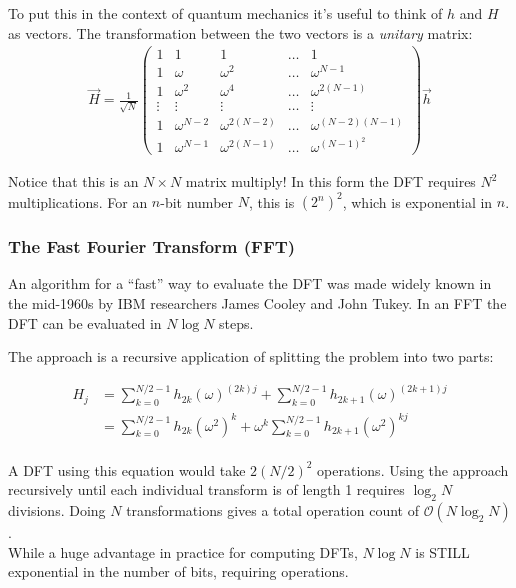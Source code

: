 \documentclass{book}
\theoremstyle{definition}
\newcommand{\nn}{\nonumber}
\newcommand{\f}[2]{\frac{#1}{#2}}
\begin{document}
To put this in the context of quantum mechanics it's useful to think of $h$
and $H$ as vectors. The transformation between the two vectors is a \textit{unitary} matrix:
\begin{align}
\vec{H} = \f{1}{\sqrt{N}}\begin{pmatrix}
1 & 1 & 1 & \dots & 1\\
1 & \omega & \omega^2 &\dots & \omega^{N-1}\\
1 & \omega^2 & \omega^4 &\dots & \omega^{2(N-1)}\\
\vdots & \vdots & \vdots & \dots  & \vdots\\
1 & \omega^{N-2} & \omega^{2(N-2)} & \dots & \omega^{(N-2)(N-1)}\\
1 & \omega^{N-1}& \omega^{2(N-1)} & \dots & \omega^{(N-1)^2}
\end{pmatrix}\vec{h}
\end{align} 

Notice that this is an $N \times N$ matrix multiply! In this form the DFT requires $N^2$ multiplications. For an $n$-bit number $N$, this is ${(2^n)}^2$, which is exponential in $n$.


\subsubsection{The Fast Fourier Transform (FFT)}


An algorithm for a ``fast'' way to evaluate the DFT was made widely known in the mid-1960s by IBM researchers James Cooley and John Tukey. In an FFT the DFT can be evaluated in $N\log N$ steps.

The approach is a recursive application of splitting the problem into two parts:

\begin{align}
H_j &= \sum^{N/2-1}_{k=0} h_{2k} (\omega)^{(2k)j} + \sum^{N/2-1}_{k=0}h_{2k + 1}(\omega)^{(2k+1)j}\nn\\
&=\sum^{N/2-1}_{k=0} h_{2k} (\omega^2)^{k} + \omega^k\sum^{N/2-1}_{k=0}h_{2k + 1}(\omega^2)^{kj}\nn\\
\end{align}

A DFT using this equation would take $2(N/2)^2$ operations. Using the approach
recursively until each individual transform is of length 1 requires $\log_2 N$ divisions.
Doing $N$ transformations gives a total operation count of $\mathcal{O}(N\log_2 N)$.\\

While a huge advantage in practice for computing DFTs, $N\log N$ is STILL exponential in the number of bits, requiring operations. 
\end{document}
